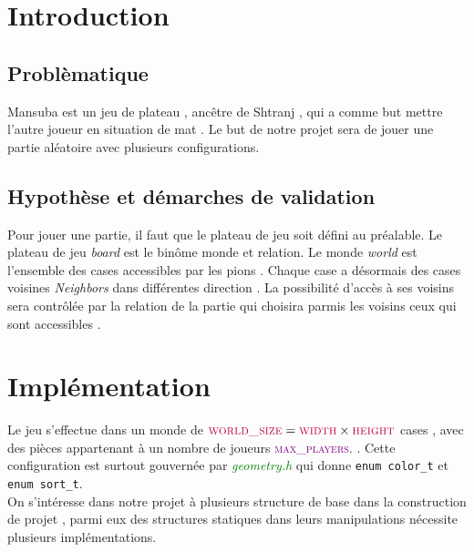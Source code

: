 \documentclass[a4paper]{article}
\begin{document}
\author{Réalisé par:\\MOHAMMED BOUHAJA ET AMIRA ELOUAZZANI \\\textbf{Encadré par: Julien Allali}}
\date{}
\maketitle





\newpage

\tableofcontents

\newpage




  


\section{Introduction}
\subsection{Problèmatique}
Mansuba est un jeu de plateau , ancêtre de Shtranj , qui a comme but mettre l’autre joueur en situation de mat . 
Le but de notre projet sera de jouer une partie aléatoire avec plusieurs configurations.
\subsection{Hypothèse et démarches de validation}
Pour jouer une partie, il faut que le plateau de jeu soit défini au préalable. Le plateau de jeu \textit{board}  est 
le binôme monde et relation. 
Le monde \textit{world} est l’ensemble des cases accessibles par les pions . Chaque case a 
désormais des cases voisines \textit{Neighbors} dans différentes direction .
La possibilité d’accès à ses voisins sera contrôlée par la relation de la partie qui choisira parmis les voisins ceux qui sont
 accessibles .  
 


\section{Implémentation}





Le jeu s’effectue dans un monde de $\textcolor{purple}{\textsc{world\_size}} = \textcolor{purple}{\textsc{width}} \times 
 \textcolor{purple}{\textsc{height}}$  cases , avec des pièces appartenant à un nombre de joueurs \textcolor{purple}{\textsc{max\_players}}.
. Cette configuration est surtout gouvernée par \textcolor{green}{\textit{geometry.h}} qui donne \lstinline|enum color_t| et \lstinline|enum sort_t|. \\
On s'intéresse dans notre projet à plusieurs structure de base dans la construction de projet , parmi eux des structures statiques dans leurs manipulations
nécessite plusieurs implémentations.
\end{document}
